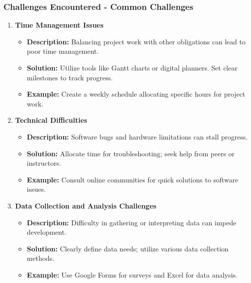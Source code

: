 \documentclass[aspectratio=169]{beamer}
\begin{document}
\begin{frame}[fragile]
    \frametitle{Challenges Encountered - Common Challenges}
    \begin{enumerate}
        \item \textbf{Time Management Issues}
        \begin{itemize}
            \item \textbf{Description:} Balancing project work with other obligations can lead to poor time management.
            \item \textbf{Solution:} Utilize tools like Gantt charts or digital planners. Set clear milestones to track progress.
            \item \textbf{Example:} Create a weekly schedule allocating specific hours for project work.
        \end{itemize}

        \item \textbf{Technical Difficulties}
        \begin{itemize}
            \item \textbf{Description:} Software bugs and hardware limitations can stall progress.
            \item \textbf{Solution:} Allocate time for troubleshooting; seek help from peers or instructors.
            \item \textbf{Example:} Consult online communities for quick solutions to software issues.
        \end{itemize}

        \item \textbf{Data Collection and Analysis Challenges}
        \begin{itemize}
            \item \textbf{Description:} Difficulty in gathering or interpreting data can impede development.
            \item \textbf{Solution:} Clearly define data needs; utilize various data collection methods.
            \item \textbf{Example:} Use Google Forms for surveys and Excel for data analysis.
        \end{itemize}
    \end{enumerate}
\end{frame}
\end{document}
